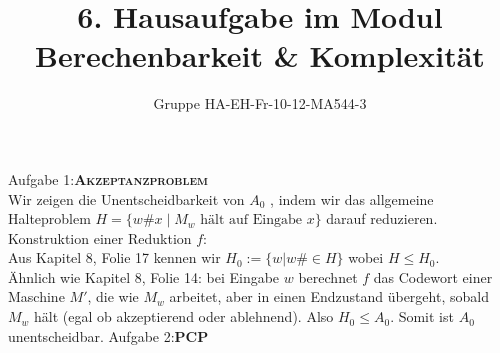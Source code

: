 \documentclass[a4paper,onecolumn,oneside,12pt,ngerman]{article}
\date{}
\title{6. Hausaufgabe im Modul \\ \glqq Berechenbarkeit \& Komplexität\grqq} %
\author{Gruppe HA-EH-Fr-10-12-MA544-3} %
\theoremstyle{plain} %
\theoremstyle{definition} %
\theoremstyle{remark} %
\theoremstyle{plain}
\begin{document}

\maketitle
\newpage
Aufgabe 1:\quad \textsc{\textbf{Akzeptanzproblem}}
\vspace{20pt}\\
Wir zeigen die Unentscheidbarkeit von  $A_0$ , indem wir das allgemeine Halteproblem  $H = \{ w\#x \mid M_w \text{ hält auf Eingabe } x \}$  darauf reduzieren.
\\Konstruktion einer Reduktion $f$:\\
Aus Kapitel 8, Folie 17 kennen wir $H_0 := \{w\vert w\# \in H\}$ wobei $H\leq H_0$.\\
Ähnlich wie Kapitel 8, Folie 14: bei Eingabe $w$ berechnet $f$ das Codewort einer Maschine $M'$, die wie $M_w$ arbeitet, 
aber in einen Endzustand übergeht, sobald $M_w$ hält (egal ob akzeptierend oder ablehnend).
Also $H_0\leq A_0$. Somit ist $A_0$ unentscheidbar.
\newpage
Aufgabe 2:\quad \textsc{\textbf{PCP}}
\end{document}
